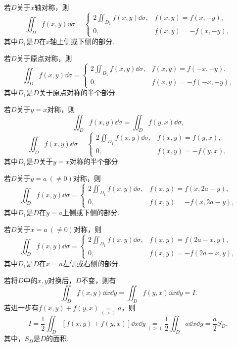 若\(D\)关于\(x\)轴对称，则\[
	\iint_D f(x,y) \dd\sigma
	= \left\{ \begin{array}{cc}
		2 \iint_{D_1} f(x,y) \dd\sigma, & f(x,y) = f(x,-y), \\
		0, & f(x,y) = -f(x,-y),
	\end{array} \right.
\]
其中\(D_1\)是\(D\)在\(x\)轴上侧或下侧的部分.

若\(D\)关于原点对称，则\[
	\iint_D f(x,y) \dd\sigma
	= \left\{ \begin{array}{cc}
		2 \iint_{D_1} f(x,y) \dd\sigma, & f(x,y) = f(-x,-y), \\
		0, & f(x,y) = -f(-x,-y),
	\end{array} \right.
\]
其中\(D_1\)是\(D\)关于原点对称的半个部分.

若\(D\)关于\(y=x\)对称，则\[
	\iint_D f(x,y) \dd\sigma = \iint_D f(y,x) \dd\sigma,
\]\[
	\iint_D f(x,y) \dd\sigma
	= \left\{ \begin{array}{cc}
		2 \iint_{D_1} f(x,y) \dd\sigma, & f(x,y) = f(y,x), \\
		0, & f(x,y) = -f(y,x),
	\end{array} \right.
\]
其中\(D_1\)是\(D\)关于\(y=x\)对称的半个部分.

若\(D\)关于\(y=a\ (\neq0)\)对称，则\[
	\iint_D f(x,y) \dd\sigma
	= \left\{ \begin{array}{cc}
		2 \iint_{D_1} f(x,y) \dd\sigma, & f(x,y) = f(x,2a-y), \\
		0, & f(x,y) = -f(x,2a-y),
	\end{array} \right.
\]
其中\(D_1\)是\(D\)在\(y=a\)上侧或下侧的部分.

若\(D\)关于\(x=a\ (\neq0)\)对称，则\[
	\iint_D f(x,y) \dd\sigma
	= \left\{ \begin{array}{cc}
		2 \iint_{D_1} f(x,y) \dd\sigma, & f(x,y) = f(2a-x,y), \\
		0, & f(x,y) = -f(2a-x,y),
	\end{array} \right.
\]
其中\(D_1\)是\(D\)在\(x=a\)左侧或右侧的部分.

\def\op{\underset{(>)}{=}}
若将\(D\)中的\(x,y\)对换后，\(D\)不变，则有\[
	\iint_D f(x,y) \dd{x}\dd{y} = \iint_D f(y,x) \dd{x}\dd{y} = I.
\]
若进一步有\(f(x,y)+f(y,x) \op a\)，则\[
	I = \frac{1}{2} \iint_D [ f(x,y) + f(y,x) ] \dd{x}\dd{y}
	\op \frac{1}{2} \iint_D a \dd{x}\dd{y}
	= \frac{a}{2} S_D,
\]
其中，\(S_D\)是\(D\)的面积.
\endgroup


